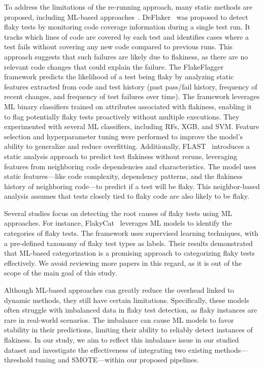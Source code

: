 To address the limitations of the re-running approach, many static methods are proposed, including ML-based approaches~\cite{bell2018deflaker, alshammari2021flakeflagger, verdecchia2021know}. DeFlaker~\cite{bell2018deflaker} was proposed to detect flaky tests by monitoring code coverage information during a single test run. It tracks which lines of code are covered by each test and identifies cases where a test fails without covering any new code compared to previous runs. This approach suggests that such failures are likely due to flakiness, as there are no relevant code changes that could explain the failure. The FlakeFlagger~\cite{alshammari2021flakeflagger} framework predicts the likelihood of a test being flaky by analyzing static features extracted from code and test history (past pass/fail history, frequency of recent changes, and frequency of test failures over time). The framework leverages ML binary classifiers trained on attributes associated with flakiness, enabling it to flag potentially flaky tests proactively without multiple executions. They experimented with several ML classifiers, including RFs, XGB, and SVM. Feature selection and hyperparameter tuning were performed to improve the model’s ability to generalize and reduce overfitting. Additionally, FLAST~\cite{verdecchia2021know} introduces a static analysis approach to predict test flakiness without reruns, leveraging features from neighboring code dependencies and characteristics. The model uses static features—like code complexity, dependency patterns, and the flakiness history of neighboring code—to predict if a test will be flaky. This neighbor-based analysis assumes that tests closely tied to flaky code are also likely to be flaky.

Several studies focus on detecting the root causes of flaky tests using ML approaches. For instance, FlakyCat~\cite{akli2023flakycat} leverages ML models to identify the categories of flaky tests. The framework uses supervised learning techniques, with a pre-defined taxonomy of flaky test types as labels. Their results demonstrated that ML-based categorization is a promising approach to categorizing flaky tests effectively. We avoid reviewing more papers in this regard, as it is out of the scope of the main goal of this study.

Although ML-based approaches can greatly reduce the overhead linked to dynamic methods, they still have certain limitations. Specifically, these models often struggle with imbalanced data in flaky test detection, as flaky instances are rare in real-world scenarios. The imbalance can cause ML models to favor stability in their predictions, limiting their ability to reliably detect instances of flakiness. In our study, we aim to reflect this imbalance issue in our studied dataset and investigate the effectiveness of integrating two existing methods—threshold tuning and SMOTE—within our proposed pipelines.